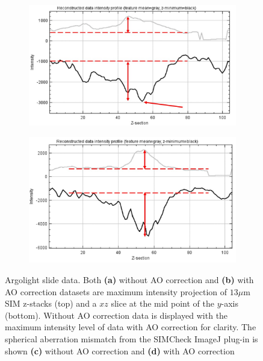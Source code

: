 \begin{figure}
	\begin{subfigure}[t]{0.45\textwidth}
		\centering
		\includegraphics[width=\linewidth]{images/Argolight_spherical_mismatch_woAO.jpg}
		\caption{}
		\label{fig:Argolight_spherical_mismatch_woAO}
	\end{subfigure}
	\begin{subfigure}[t]{0.45\textwidth}
		\centering
		\includegraphics[width=\linewidth]{images/Argolight_spherical_mismatch_AO.jpg}
		\caption{}
		\label{fig:Argolight_spherical_mismatch_AO}
	\end{subfigure}
	\caption[Argolight slide data]{Argolight slide data. Both \textbf{(a)} without AO correction and \textbf{(b)} with AO correction datasets 
	are maximum intensity projection of $13\mu$m SIM z-stacks (top) and 
	a $xz$ slice at the mid point of the $y$-axis (bottom). Without AO correction data is displayed with the maximum intensity level of data with AO correction for clarity. The spherical aberration mismatch from the SIMCheck ImageJ plug-in\cite{ball2015simcheck} is shown \textbf{(c)} without AO correction and \textbf{(d)} with AO correction}
	\label{fig:Argolight_slide_both}
\end{figure}

